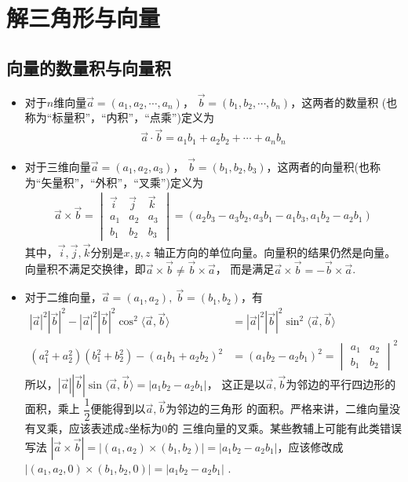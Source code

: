 \chapter{解三角形与向量}

\section{向量的数量积与向量积}
\begin{itemize}[leftmargin=\inteval{\myitemleftmargin}pt,itemsep=
   \inteval{\myitemitempsep}pt,topsep=\inteval{\myitemtopsep}pt]
\item 对于$ n $维向量$ \vec{a}=(a_1,a_2,\cdots,a_n) $，
$ \vec{b}=(b_1,b_2,\cdots,b_n) $，这两者的数量积
(也称为“标量积”，“内积”，“点乘”)定义为
\begin{gather*}
    \vec{a}\cdot \vec{b}=a_1b_1+a_2b_2+\cdots+a_nb_n
\end{gather*}

\item 对于三维向量$ \vec{a}=(a_1,a_2,a_3) $，
$ \vec{b}=(b_1,b_2,b_3) $，这两者的向量积(也称为“矢量积”，“外积”，“叉乘”)定义为
\begin{align}\label{三维向量叉乘}
    \vec{a}\times\vec{b} =
    \begin{vmatrix}
        \vec{i} & \vec{j} & \vec{k} \\
        a_1 & a_2 & a_3 \\
        b_1 & b_2 & b_3
    \end{vmatrix}
    =(a_2b_3-a_3b_2,a_3b_1-a_1b_3, a_1b_2-a_2b_1)
\end{align}
其中，$ \vec{i},\vec{j},\vec{k} $分别是$ x,y,z $
轴正方向的单位向量。向量积的结果仍然是向量。
向量积不满足交换律，即$ \vec{a}\times
\vec{b}\neq \vec{b}\times\vec{a} $，
而是满足$ \vec{a}\times \vec{b}=-\vec{b}
\times\vec{a} $. 

\item 对于二维向量，$ \vec{a}=(a_1,a_2),\ \vec{b}=(b_1,b_2) $，有
\begin{align}
    |\vec{a}|^2|\vec{b}|^2-|\vec{a}|^2|\vec{b}|^2
    \cos^2\langle\vec{a},\vec{b}\rangle 
    &=|\vec{a}|^2|\vec{b}|^2\sin^2\langle\vec{a},\vec{b}\rangle \nonumber\\
    (a_1^2+a_2^2)(b_1^2+b_2^2)-(a_1b_1+a_2b_2)^2 &=
    (a_1b_2-a_2b_1)^2=
    \begin{vmatrix}
        a_{1} & a_{2} \\
        b_{1} & b_{2}
    \end{vmatrix}
    ^2 \label{三角形面积公式x1y2-x2y1}
\end{align}
所以，$ |\vec{a}||\vec{b}|\sin\langle\vec{a},\vec{b}
\rangle=|a_1b_2-a_2b_1| $，
这正是以$ \vec{a},\vec{b} $为邻边的平行四边形的面积，乘上
$ \dfrac{1}{2} $便能得到以$ \vec{a},\vec{b} $为邻边的三角形
的面积。严格来讲，二维向量没有叉乘，应该表述成$ z $坐标为0的
三维向量的叉乘。某些教辅上可能有此类错误写法
$ |\vec{a}\times\vec{b}|=|(a_1,a_2)\times (b_1,b_2)|=
|a_1b_2-a_2b_1| $，应该修改成
$ |(a_1,a_2,0)\times (b_1,b_2,0)|=|a_1b_2-a_2b_1| $ . 


\end{itemize}
